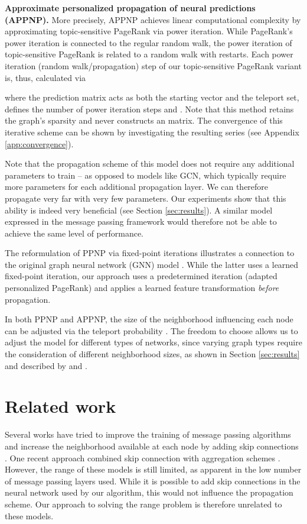 \documentclass{article} \usepackage{iclr2019_conference,times}
\begin{document}
\textbf{Approximate personalized propagation of neural predictions (APPNP).} More precisely, APPNP achieves linear computational complexity by approximating topic-sensitive PageRank via power iteration. While PageRank's power iteration is connected to the regular random walk, the power iteration of topic-sensitive PageRank is related to a random walk with restarts. Each power iteration (random walk/propagation) step of our topic-sensitive PageRank variant is, thus, calculated via

where the prediction matrix  acts as both the starting vector and the teleport set,  defines the number of power iteration steps and . Note that this method retains the graph's sparsity and never constructs an  matrix. The convergence of this iterative scheme can be shown by investigating the resulting series (see Appendix \ref{app:convergence}).


Note that the propagation scheme of this model does not require any additional parameters to train -- as opposed to models like GCN, which typically require more parameters for each additional propagation layer. We can therefore propagate very far with very few parameters. Our experiments show that this ability is indeed very beneficial (see Section \ref{sec:results}). A similar model expressed in the message passing framework would therefore not be able to achieve the same level of performance.

The reformulation of PPNP via fixed-point iterations illustrates a connection to the original graph neural network (GNN) model \citep{scarselli_graph_2009}. While the latter uses a learned fixed-point iteration, our approach uses a predetermined iteration (adapted personalized PageRank) and applies a learned feature transformation \emph{before} propagation.

In both PPNP and APPNP, the size of the neighborhood influencing each node can be adjusted via the teleport probability . The freedom to choose  allows us to adjust the model for different types of networks, since varying graph types require the consideration of different neighborhood sizes, as shown in Section \ref{sec:results} and described by \citet{grover_node2vec:_2016} and \citet{abu-el-haija_watch_2018}.

\section{Related work}

Several works have tried to improve the training of message passing algorithms and increase the neighborhood available at each node by adding skip connections \citep{li_gated_2016,pham_column_2017,hamilton_inductive_2017,ying_graph_2018}. One recent approach combined skip connection with aggregation schemes \citep{xu_representation_2018}. However, the range of these models is still limited, as apparent in the low number of message passing layers used. While it is possible to add skip connections in the neural network used by our algorithm, this would not influence the propagation scheme. Our approach to solving the range problem is therefore unrelated to these models.
\end{document}
